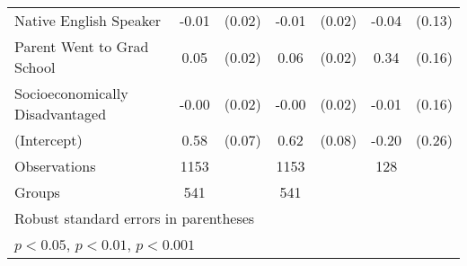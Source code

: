 {\begin{tabular}{l*{3}{cc}}
Native English Speaker&       -0.01         &      (0.02)&       -0.01         &      (0.02)&       -0.04         &      (0.13)\\
Parent Went to Grad School&        0.05\sym{*}  &      (0.02)&        0.06\sym{*}  &      (0.02)&        0.34\sym{*}  &      (0.16)\\
Socioeconomically Disadvantaged&       -0.00         &      (0.02)&       -0.00         &      (0.02)&       -0.01         &      (0.16)\\
(Intercept)         &        0.58\sym{***}&      (0.07)&        0.62\sym{***}&      (0.08)&       -0.20         &      (0.26)\\
\midrule
Observations        &        1153         &            &        1153         &            &         128         &            \\
Groups              &         541         &            &         541         &            &                     &            \\
\bottomrule
\multicolumn{7}{l}{\footnotesize Robust standard errors in parentheses}\\
\multicolumn{7}{l}{\footnotesize \sym{*} \(p<0.05\), \sym{**} \(p<0.01\), \sym{***} \(p<0.001\)}\\
\end{tabular}
}
